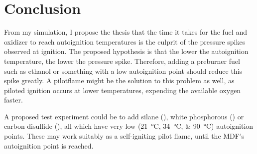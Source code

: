 \chapter{Conclusion}

From my simulation, I propose the thesis that the time it takes for the fuel and oxidizer to reach autoignition temperatures is the culprit of the pressure spikes observed at ignition. The proposed hypothesis is that the lower the autoignition temperature, the lower the pressure spike. Therefore, adding a preburner fuel such as ethanol or something with a low autoignition point should reduce this spike greatly. A pilotflame might be the solution to this problem as well, as piloted ignition occurs at lower temperatures, expending the available oxygen faster.

A proposed test experiment could be to add silane (), white phosphorous () or carbon disulfide (), all which have very low (\SIlist{21;34;90}{\celsius}) autoignition points. These may work suitably as a self-igniting pilot flame, until the MDF's autoignition point is reached.
